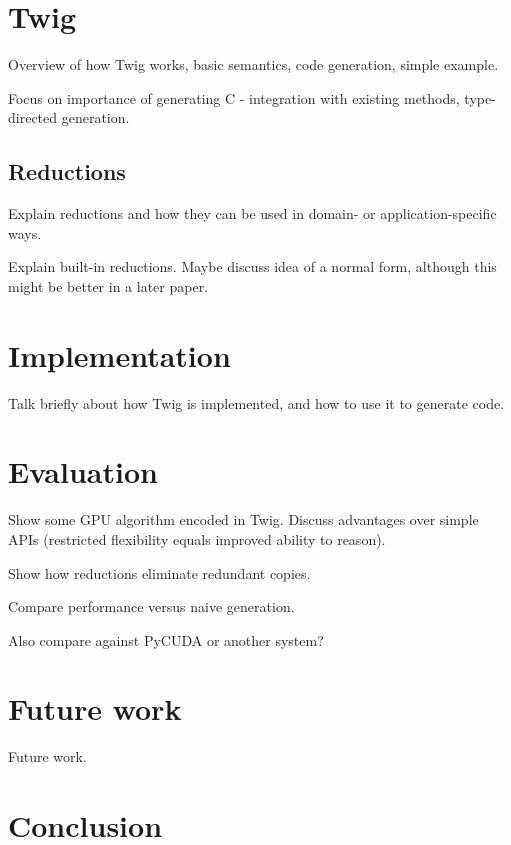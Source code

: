 \documentclass[11pt]{article}
\begin{document}
\section{Twig}

Overview of how Twig works, basic semantics, code generation, simple example.

Focus on importance of generating C - integration with existing methods, type-directed generation.

\subsection{Reductions}

Explain reductions and how they can be used in domain- or application-specific
ways.

Explain built-in reductions. Maybe discuss idea of a normal form, although
this might be better in a later paper.

\section{Implementation}

Talk briefly about how Twig is implemented, and how to use it to generate
code.

\section{Evaluation}

Show some GPU algorithm encoded in Twig. Discuss advantages over simple APIs
(restricted flexibility equals improved ability to reason).

Show how reductions eliminate redundant copies.

Compare performance versus naive generation.

Also compare against PyCUDA or another system?

\section{Future work}

Future work.

\section{Conclusion}


% 

% 
% 
\end{document}
